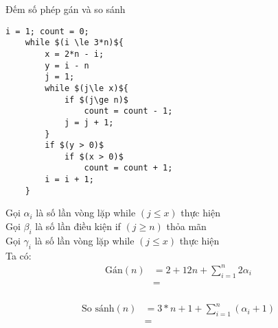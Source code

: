 Đếm số phép gán và so sánh
\begin{lstlisting}[mathescape]
    i = 1; count = 0;
    while $(i \le 3*n)${
        x = 2*n - i;
        y = i - n
        j = 1;
        while $(j\le x)${
            if $(j\ge n)$
                count = count - 1;
            j = j + 1;
        }
        if $(y > 0)$
            if $(x > 0)$
                count = count + 1;
        i = i + 1;
    }
\end{lstlisting}
Gọi $\alpha_i$ là số lần vòng lặp while $(j\le x)$ thực hiện\\
Gọi $\beta_i$ là số lần điều kiện if $(j\ge n)$ thỏa mãn\\
Gọi $\gamma_i$ là số lần vòng lặp while $(j\le x)$ thực hiện\\
Ta có:
\begin{align*}
    \text{Gán} (n) &= 2 + 12n + \sum_{i = 1}^{n}2\alpha_i\\
        &=\\
\end{align*}

\begin{align*}
    \text{So sánh} (n) &= 3*n + 1 + \sum_{i = 1}^{n}(\alpha_i + 1)\\
        &=\\
\end{align*}


